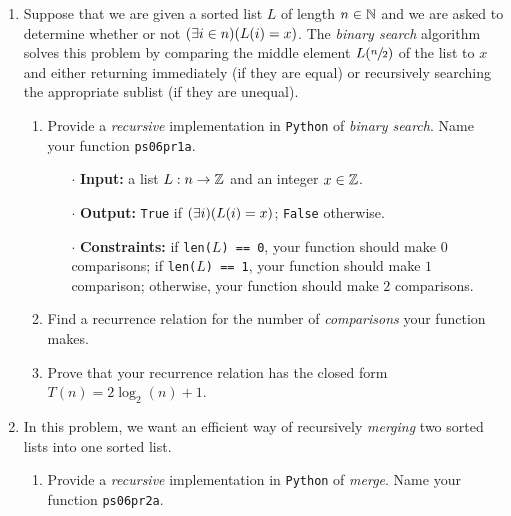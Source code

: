 \begin{enumerate}
    \item
        Suppose that we are given a sorted list $L$ of length $n \in \mathbb{N}$
        and we are asked to determine
        whether or not $\pn*{\exists i \in n}\pn*{L(i) = x}$.
        The \emph{binary search} algorithm solves this problem by comparing the middle element $L\pn*{\sfrac{n}{2}}$ of the list to $x$ and either returning immediately (if they are equal)
        or recursively searching the appropriate sublist (if they are unequal).
        \begin{enumerate}
            \item
                Provide a \emph{recursive} implementation in \texttt{Python} of \emph{binary search}.
                Name your function \texttt{ps06pr1a}.
                \begin{itemize}
                    \item[$\cdot$]
                        \textbf{Input:}
                        a list $L: n \to \mathbb{Z}$ and an integer $x \in \mathbb{Z}$.
                    \item[$\cdot$]
                        \textbf{Output:}
                        \texttt{True} if $\pn*{\exists i}\pn*{L(i) = x}$; \texttt{False} otherwise.
                    \item[$\cdot$]
                        \textbf{Constraints:}
                        if \texttt{len($L$) == 0}, your function should make $0$ comparisons;
                        if \texttt{len($L$) == 1}, your function should make $1$ comparison;
                        otherwise, your function should make $2$ comparisons.
                \end{itemize}
            \item
                Find a recurrence relation for the number of \emph{comparisons} your function makes.
            \item
                Prove that your recurrence relation has the closed form $T(n) = 2\log_2(n) + 1$.
        \end{enumerate}
    \item
        In this problem,
        we want an efficient way of recursively \emph{merging} two sorted lists into one sorted list.
        \begin{enumerate}
            \item
                Provide a \emph{recursive} implementation in \texttt{Python} of \emph{merge}.
                Name your function \texttt{ps06pr2a}.
                \begin{itemize}

\end{itemize}
\end{enumerate}
\end{enumerate}
